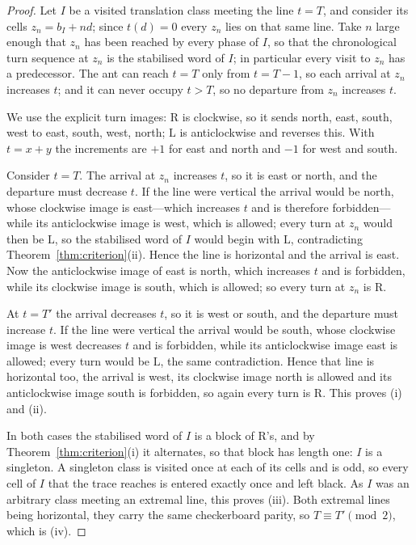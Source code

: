 \documentclass[11pt,letterpaper]{article}
\theoremstyle{plain}
\theoremstyle{definition}
\newcommand{\drift}{d}
\newcommand{\turnR}{\mathrm{R}}
\newcommand{\turnL}{\mathrm{L}}
\begin{document}
\begin{NoHyper}
\begin{proof}
Let $I$ be a visited translation class meeting the line $t=T$, and consider its cells
$z_n=b_I+n\drift$; since $t(\drift)=0$ every $z_n$ lies on that same line. Take $n$
large enough that $z_n$ has been reached by every phase of $I$, so that the
chronological turn sequence at $z_n$ is the stabilised word of $I$; in particular
every visit to $z_n$ has a predecessor. The ant can reach $t=T$ only from $t=T-1$, so
each arrival at $z_n$ increases $t$; and it can never occupy $t>T$, so no departure
from $z_n$ increases $t$.

We use the explicit turn images: $\turnR$ is clockwise, so it sends north, east,
south, west to east, south, west, north; $\turnL$ is anticlockwise and reverses this.
With $t=x+y$ the increments are $+1$ for east and north and $-1$ for west and south.

Consider $t=T$. The arrival at $z_n$ increases $t$, so it is east or north, and the
departure must decrease $t$. If the line were vertical the arrival would be north,
whose clockwise image is east---which increases $t$ and is therefore forbidden---while
its anticlockwise image is west, which is allowed; every turn at $z_n$ would then be
$\turnL$, so the stabilised word of $I$ would begin with $\turnL$, contradicting
Theorem~\ref{thm:criterion}(ii). Hence the line is horizontal and the arrival is east.
Now the anticlockwise image of east is north, which increases $t$ and is forbidden,
while its clockwise image is south, which is allowed; so every turn at $z_n$ is
$\turnR$.

At $t=T'$ the arrival decreases $t$, so it is west or south, and the departure must
increase $t$. If the line were vertical the arrival would be south, whose clockwise
image is west decreases $t$ and is forbidden, while its anticlockwise image east is
allowed; every turn would be $\turnL$, the same contradiction. Hence that line is
horizontal too, the arrival is west, its clockwise image north is allowed and its
anticlockwise image south is forbidden, so again every turn is $\turnR$. This proves
(i) and (ii).

In both cases the stabilised word of $I$ is a block of $\turnR$'s, and by
Theorem~\ref{thm:criterion}(i) it alternates, so that block has length one: $I$ is a
singleton. A singleton class is visited once at each of its cells and is odd, so every
cell of $I$ that the trace reaches is entered exactly once and left black. As $I$ was
an arbitrary class meeting an extremal line, this proves (iii). Both extremal lines
being horizontal, they carry the same checkerboard parity, so $T\equiv T'\pmod2$,
which is (iv).
\end{proof}


\end{NoHyper}
\end{document}
